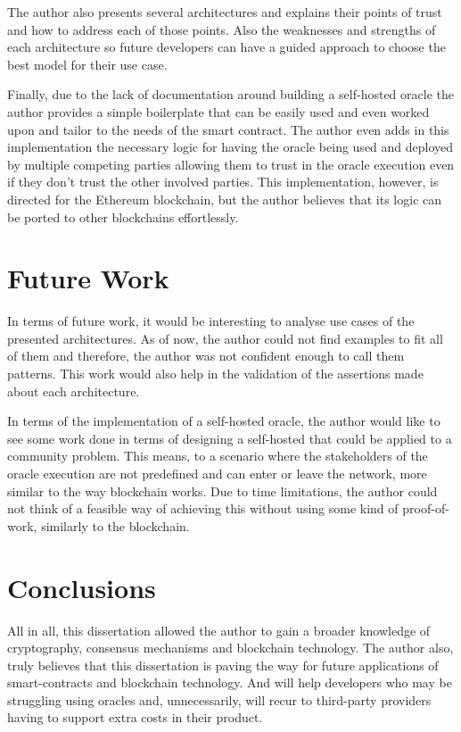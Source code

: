 The author also presents several architectures and explains their points of trust and how to address each of those points. Also the weaknesses and strengths of each architecture so future developers can have a guided approach to choose the best model for their use case.

Finally, due to the lack of documentation around building a self-hosted oracle the author provides a simple boilerplate that can be easily used and even worked upon and tailor to the needs of the smart contract. The author even adds in this implementation the necessary logic for having the oracle being used and deployed by multiple competing parties allowing them to trust in the oracle execution even if they don't trust the other involved parties. This implementation, however, is directed for the Ethereum blockchain, but the author believes that its logic can be ported to other blockchains effortlessly.

\section{Future Work}

In terms of future work, it would be interesting to analyse use cases of the presented architectures. As of now, the author could not find examples to fit all of them and therefore, the author was not confident enough to call them patterns. This work would also help in the validation of the assertions made about each architecture.

In terms of the implementation of a self-hosted oracle, the author would like to see some work done in terms of designing a self-hosted that could be applied to a community problem. This means, to a scenario where the stakeholders of the oracle execution are not predefined and can enter or leave the network, more similar to the way blockchain works. Due to time limitations, the author could not think of a feasible way of achieving this without using some kind of proof-of-work, similarly to the blockchain.


\section{Conclusions}

All in all, this dissertation allowed the author to gain a broader knowledge of cryptography, consensus mechanisms and blockchain technology. The author also, truly believes that this dissertation is paving the way for future applications of smart-contracts and blockchain technology. And will help developers who may be struggling using oracles and, unnecessarily, will recur to third-party providers having to support extra costs in their product.